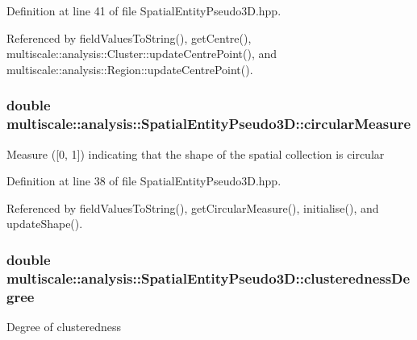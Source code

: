 Definition at line 41 of file Spatial\-Entity\-Pseudo3\-D.\-hpp.



Referenced by field\-Values\-To\-String(), get\-Centre(), multiscale\-::analysis\-::\-Cluster\-::update\-Centre\-Point(), and multiscale\-::analysis\-::\-Region\-::update\-Centre\-Point().

\hypertarget{classmultiscale_1_1analysis_1_1SpatialEntityPseudo3D_aa4ac170fb21e9697358d47ba6ea7a267}{
\subsubsection[{circular\-Measure}]{\setlength{\rightskip}{0pt plus 5cm}double multiscale\-::analysis\-::\-Spatial\-Entity\-Pseudo3\-D\-::circular\-Measure\hspace{0.3cm}{\ttfamily [protected]}}}\label{classmultiscale_1_1analysis_1_1SpatialEntityPseudo3D_aa4ac170fb21e9697358d47ba6ea7a267}
Measure (\mbox{[}0, 1\mbox{]}) indicating that the shape of the spatial collection is circular 

Definition at line 38 of file Spatial\-Entity\-Pseudo3\-D.\-hpp.



Referenced by field\-Values\-To\-String(), get\-Circular\-Measure(), initialise(), and update\-Shape().

\hypertarget{classmultiscale_1_1analysis_1_1SpatialEntityPseudo3D_a22a84312e7c497cc5fbc4d8b41d8fd45}{
\subsubsection[{clusteredness\-Degree}]{\setlength{\rightskip}{0pt plus 5cm}double multiscale\-::analysis\-::\-Spatial\-Entity\-Pseudo3\-D\-::clusteredness\-Degree\hspace{0.3cm}{\ttfamily [protected]}}}\label{classmultiscale_1_1analysis_1_1SpatialEntityPseudo3D_a22a84312e7c497cc5fbc4d8b41d8fd45}
Degree of clusteredness 

